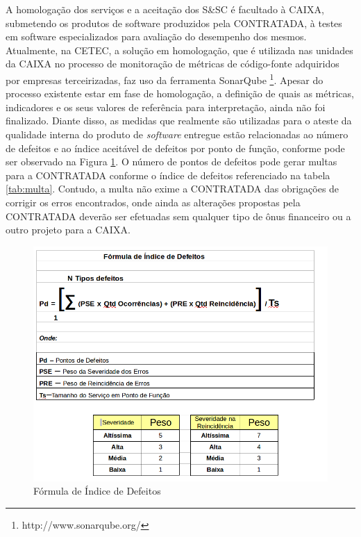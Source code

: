 A homologação dos serviços e a aceitação dos S\&SC é facultado à CAIXA, submetendo os produtos de software produzidos pela CONTRATADA, à testes em software especializados para avaliação do desempenho dos mesmos. Atualmente, na CETEC, a solução em homologação, que é utilizada nas unidades da CAIXA no processo de monitoração de métricas de código-fonte adquiridos por empresas terceirizadas, faz uso da ferramenta SonarQube \footnote{http://www.sonarqube.org/}. Apesar do processo existente estar em fase de homologação, a definição de quais as métricas, indicadores e os seus valores de referência para interpretação, ainda não foi finalizado. Diante disso, as medidas que realmente são utilizadas para o ateste da qualidade interna do produto de \textit{software} entregue estão relacionadas ao número de defeitos e ao índice aceitável de defeitos por ponto de função, conforme pode ser observado na Figura \ref{formula}. O número de pontos de defeitos pode gerar multas para a CONTRATADA conforme o índice de defeitos referenciado na tabela \ref{tab:multa}. Contudo, a multa não exime a CONTRATADA das obrigações de corrigir os erros encontrados, onde ainda as alterações propostas pela CONTRATADA deverão ser efetuadas sem qualquer tipo de ônus financeiro ou a outro projeto para a CAIXA.



\begin{figure}[h!]
\centering
\includegraphics[keepaspectratio=false,scale=0.6]{figuras/figuras_nilton/formula.png}
\caption{Fórmula de Índice de Defeitos}
\label{formula}
\end{figure}

